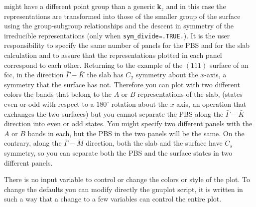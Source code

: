 \documentclass[12pt,a4paper]{article}
\begin{document}
might have a different point group than a generic {\bf k}$_z$ and in this
case the representations are transformed into those of the smaller
group of the surface using the group-subgroup relationships and
the descent in symmetry of the irreducible representations
(only when \texttt{sym\_divide=.TRUE.}).
It is the user responsibility to specify the same number of panels
for the PBS and for the slab calculation and to assure that the
representations plotted in each panel correspond to each other.
Returning to the example of the $(111)$ surface of an fcc, in the direction
$\bar \Gamma-\bar K$ the slab has $C_2$ symmetry about the $x$-axis, a symmetry
that the surface has not. Therefore you can plot with two different colors
the bands that belong to the $A$ or $B$ representations of the slab,
(states even or odd with respect to a $180^\circ$ rotation about
the $x$ axis, an operation that exchanges the two surfaces)
but you cannot separate the PBS along the $\bar \Gamma-\bar K$ direction into
even or odd states. You might specify two different panels with the
$A$ or $B$ bands in each, but the PBS in the two panels will be the same. 
On the contrary, along the $\bar \Gamma-\bar M$ direction, both the slab and 
the surface have $C_s$ symmetry, so you can separate both the PBS 
and the surface states in two different panels.

There is no input variable to control or change the colors or style of the 
plot. To change the defaults you can modify directly the gnuplot script,
it is written in such a way that a change to a few variables can
control the entire plot.
\end{document}
